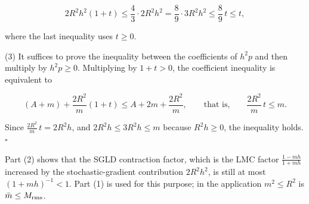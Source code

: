 \documentclass[11pt,a4paper]{report}
\begin{document}
\[2R^2h^2(1+t)\le\frac43\cdot2R^2h^2=\frac89\cdot3R^2h^2\le\frac89\,t\le t,\]


where the last inequality uses \(t\ge0\).




(3) It suffices to prove the inequality between the coefficients of \(h^2p\) and then multiply by \(h^2p\ge0\). Multiplying by \(1+t>0\), the coefficient inequality is equivalent to


\[(A+m)+\frac{2R^2}m(1+t)\le A+2m+\frac{2R^2}m,\qquad\text{that is,}\qquad\frac{2R^2}m\,t\le m.\]


Since \(\frac{2R^2}m\,t=2R^2h\), and \(2R^2h\le3R^2h\le m\) because \(R^2h\ge0\), the inequality holds. \(\square\)




Part (2) shows that the SGLD contraction factor, which is the LMC factor \(\frac{1-mh}{1+mh}\) increased by the stochastic-gradient contribution \(2R^2h^2\), is still at most \((1+mh)^{-1}<1\). Part (1) is used for this purpose; in the application \(m^2\le R^2\) is \(\bar m\le M_{\rm rms}\).
\end{document}
